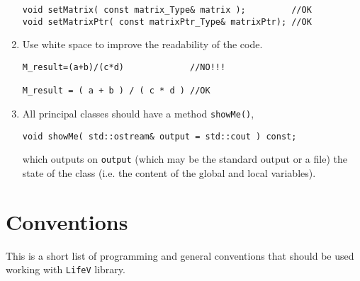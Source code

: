 \documentclass[10p]{article}
\begin{document}
\begin{enumerate}
\begin{lstlisting}
void setMatrix( const matrix_Type& matrix );         //OK
void setMatrixPtr( const matrixPtr_Type& matrixPtr); //OK
\end{lstlisting}
  \item Use white space to improve the readability of the code.
\begin{lstlisting}
M_result=(a+b)/(c*d)             //NO!!!

M_result = ( a + b ) / ( c * d ) //OK
\end{lstlisting}
  \item All principal classes should have a method \texttt{showMe()},
\begin{lstlisting}
void showMe( std::ostream& output = std::cout ) const;
\end{lstlisting}
  which outputs on \texttt{output} (which may be the standard output or a file) the state of the class (i.e.  the content of the global and local variables).
\end{enumerate}

\section{Conventions}
This is a short list of programming and general conventions that should be used working with \texttt{LifeV} library.
\end{document}
